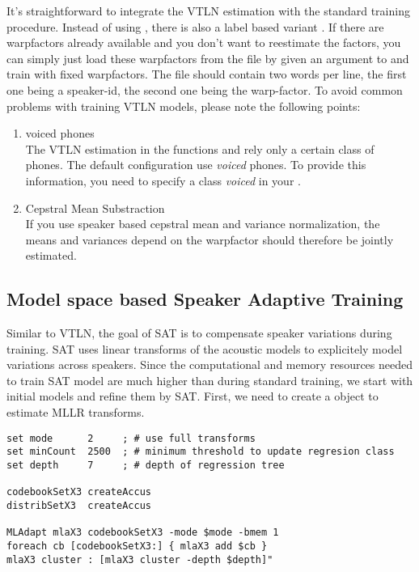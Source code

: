 It's   straightforward to  integrate  the  VTLN   estimation  with the
standard        training    procedure.       Instead       of    using
, there   is also  a label   based variant
. If there are warpfactors already available
and you don't want to reestimate the factors, you can simply just load
these  warpfactors   from   the   file   by  given  an   argument   to
  and  train  with  fixed warpfactors.   The file
should contain  two words per line, the  first one being a speaker-id,
the second one being the  warp-factor.  To avoid common problems  with
training VTLN models, please note the following points:

\begin{enumerate}

\item voiced phones\\
The VTLN estimation in the functions  and 
 rely only a certain class of phones. The
default configuration use  {\em voiced} phones. To provide this
information, you need to specify a class {\em voiced} in your 
.

\item Cepstral Mean Substraction\\
If you use speaker based cepstral mean and variance normalization, 
the means and variances depend on the warpfactor should therefore
be jointly estimated.

\end{enumerate}

\subsection{Model space based Speaker Adaptive Training}

Similar to VTLN, the  goal of SAT  is to compensate speaker variations
during training. SAT uses linear  transforms of the acoustic models to
explicitely model variations  across speakers. Since the computational
and memory resources  needed to train SAT model  are much  higher than
during standard training, we start with initial models and refine them
by SAT.   First, we need  to create a  object to
estimate MLLR transforms.

\begin{verbatim}
set mode      2     ; # use full transforms
set minCount  2500  ; # minimum threshold to update regresion class
set depth     7     ; # depth of regression tree

codebookSetX3 createAccus
distribSetX3  createAccus

MLAdapt mlaX3 codebookSetX3 -mode $mode -bmem 1
foreach cb [codebookSetX3:] { mlaX3 add $cb }
mlaX3 cluster : [mlaX3 cluster -depth $depth]"
\end{verbatim}

